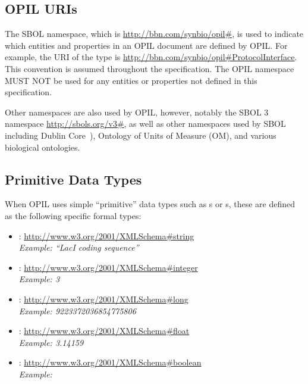 \subsection{OPIL URIs}
 \label{sec:sbolURIs}
  
The SBOL namespace, which is \url{http://bbn.com/synbio/opil\#}, is used to indicate which entities and properties in an OPIL document are defined by OPIL. 
For example, the URI of the type  is \url{http://bbn.com/synbio/opil\#ProtocolInterface}. 
This convention is assumed throughout the specification.
The OPIL namespace MUST NOT be used for any entities or properties not defined in this specification.  

Other namespaces are also used by OPIL, however, notably the SBOL 3 namespace \url{http://sbols.org/v3\#}, as well as other namespaces used by SBOL including Dublin Core~\citep{dcmi2012}), Ontology of Units of Measure (OM), and various biological ontologies.


\subsection{Primitive Data Types}
\label{sec:datatypes}
\label{sec:string}
\label{sec:integer}
\label{sec:long}
\label{sec:float}
\label{sec:boolean}
\label{sec:URI}
\label{sec:literal}

When OPIL uses simple ``primitive'' data types such as s or s, these are defined as the following specific formal types:
\begin{itemize}
\item {}: \url{http://www.w3.org/2001/XMLSchema\#string}\\
  {\em Example: ``LacI coding sequence''}
\item {}: \url{http://www.w3.org/2001/XMLSchema\#integer}\\
  {\em Example: 3}
\item {}: \url{http://www.w3.org/2001/XMLSchema\#long}\\
  {\em Example: 9223372036854775806}
\item {}: \url{http://www.w3.org/2001/XMLSchema\#float}\\
  {\em Example: 3.14159}
\item {}: \url{http://www.w3.org/2001/XMLSchema\#boolean}\\
  {\em Example: }
\end{itemize}

